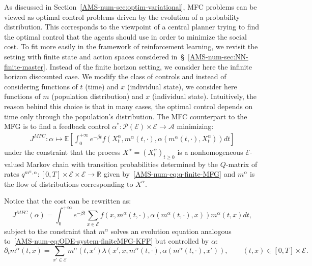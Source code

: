 \documentclass{amsproc}
\theoremstyle{definition}
\theoremstyle{remark}
\numberwithin{equation}{section}
\newcommand{\EE}{{\mathbb E}}
\newcommand{\RR}{{\mathbb R}}
\newcommand{\cA}{{\mathcal A}}
\newcommand{\cE}{{\mathcal E}}
\newcommand{\cP}{{\mathcal P}}
\newcommand{\ctrl}{\alpha}
\begin{document}
As discussed in Section~\ref{AMS-num-sec:optim-variational}, MFC problems can be viewed as optimal control problems driven by the evolution of a probability distribution. This corresponds to the viewpoint of a central planner trying to find the optimal control that the agents should use in order to minimize the social cost. To fit more easily in the framework of reinforcement learning, we revisit the setting with finite state and action spaces considered in~\S~\ref{AMS-num-sec:NN-finite-master}. Instead of the finite horizon setting, we consider here the infinite horizon discounted case. We modify the class of controls and instead of considering functions of $t$ (time) and $x$ (individual state), we consider here functions of $m$ (population distribution) and $x$ (individual state). Intuitively, the reason behind this choice is that in many cases, the optimal control depends on time only through the population's distribution. The MFC counterpart to the MFG is to find a feedback control $\ctrl^*: \cP(\cE) \times \cE \to \cA$ minimizing:
\begin{align*}
	J^{MFC}: \ctrl \mapsto  \EE \left[\int_0^{+\infty} e^{-\beta t} f(X_t^{\ctrl}, m^\ctrl(t,\cdot), \ctrl(m^\ctrl(t,\cdot),X_t^{\ctrl}) ) dt  \right]
\end{align*}
under the constraint that the  process $X^{\ctrl} = (X_t^{\ctrl})_{t \ge 0}$ is a nonhomogeneous $\cE$-valued Markov chain with transition probabilities determined by the $Q$-matrix of rates $q^{m^\ctrl, \ctrl}: [0,T] \times \cE \times \cE \to \RR$ given by~\eqref{AMS-num-eq:q-finite-MFG} and $m^\ctrl$ is the flow of distributions corresponding to $X^{\ctrl}$.

Notice that the cost can be rewritten as:
$$
	J^{MFC}(\ctrl) = \int_0^{+\infty} e^{-\beta t} \sum_{x\in\cE} f(x, m^\ctrl(t,\cdot), \ctrl(m^\ctrl(t,\cdot),x) ) m^\ctrl(t,x) dt ,
$$
subject to the constraint that $m^\ctrl$ solves an evolution equation analogous to~\eqref{AMS-num-eq:ODE-system-finiteMFG-KFP} but controlled by $\ctrl$:
$$
	\partial_t m^\ctrl(t,x) = \sum_{x' \in \cE} m^\ctrl(t,x') \lambda(x', x, m^\ctrl(t,\cdot), \ctrl(m^\ctrl(t,\cdot), x')), \qquad (t,x) \in [0,T] \times \cE.
$$
\end{document}
